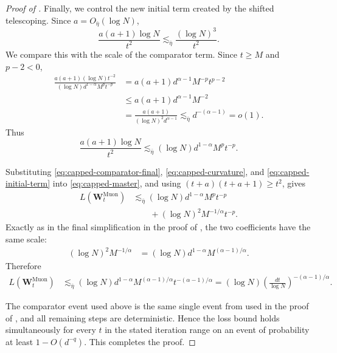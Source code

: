 \documentclass[11pt]{article}
\theoremstyle{definition}
\newcommand{\Wb}{\mathbf{W}}
\begin{document}
\begin{proof}[Proof of ]
Finally, we control the new initial term created by the shifted
telescoping.  Since \(a=O_{\bar\eta}(\log N)\),
\[
\frac{a(a+1)\log N}{t^2}
\lesssim_{\bar\eta}
\frac{(\log N)^3}{t^2}.
\]
We compare this with the scale of the comparator term.  Since \(t\ge M\)
and \(p-2<0\),
\begin{align*}
\frac{
a(a+1)(\log N)t^{-2}
}{
(\log N)d^{1-\alpha}M^pt^{-p}
} &=
a(a+1)d^{\alpha-1}M^{-p}t^{p-2}\\
&\leq
a(a+1)d^{\alpha-1}M^{-2}\\
&=
\frac{a(a+1)}
{(\log N)^2d^{\alpha-1}}
\lesssim_{\bar\eta}
d^{-(\alpha-1)}
=o(1).
\end{align*}
Thus
\begin{equation}
\frac{a(a+1)\log N}{t^2}
\lesssim_{\bar\eta}
(\log N)d^{1-\alpha}M^pt^{-p}.
\label{eq:capped-initial-term}
\end{equation}

Substituting
\eqref{eq:capped-comparator-final},
\eqref{eq:capped-curvature}, and
\eqref{eq:capped-initial-term}
into \eqref{eq:capped-master}, and using
\((t+a)(t+a+1)\ge t^2\), gives
\begin{align*}
L(\Wb_t^{\mathrm{Muon}})
&\lesssim_{\bar\eta}
(\log N)d^{1-\alpha}
M^pt^{-p}\\
&\qquad+
(\log N)^2
M^{-1/\alpha}t^{-p}.
\end{align*}
Exactly as in the final simplification in the proof of
, the two coefficients have the same scale:
\begin{align*}
(\log N)^2M^{-1/\alpha}
&=
(\log N)d^{1-\alpha}M^{(\alpha-1)/\alpha}.
\end{align*}
Therefore
\begin{align*}
L(\Wb_t^{\mathrm{Muon}})
&\lesssim_{\bar\eta}
(\log N)d^{1-\alpha}
M^{(\alpha-1)/\alpha}
t^{-(\alpha-1)/\alpha}=
(\log N)\left(\frac{dt}{\log N}\right)^{-(\alpha-1)/\alpha}.
\end{align*}

The comparator event used above is the same single event from
 used in the proof of
, and all remaining steps are deterministic.
Hence the loss bound holds simultaneously for every \(t\) in the stated
iteration range on an event of probability at least \(1-O(d^{-q})\).
This completes the proof.
\end{proof}

\end{document}
